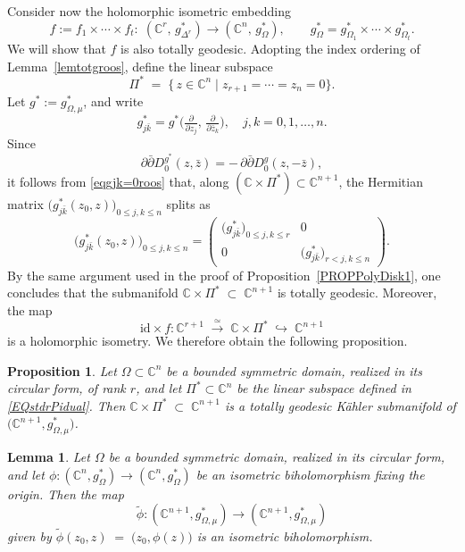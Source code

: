 \documentclass[reqno, 11pt]{amsart}
\newtheorem{prop}[theor]{Proposition}
\newtheorem{lemma}[theor]{Lemma}
\newcommand{\C}{\mathbb{C}}
\begin{document}
Consider now the holomorphic isometric embedding
\[
f:=f_1\times\cdots\times f_t:\;(\C^{r},\,g_{\Delta^{r}}^*) \longrightarrow (\C^{n},\,g_{\Omega}^*),
\qquad
g_{\Omega}^*=g_{\Omega_1}^*\times\cdots\times g_{\Omega_t}^*.
\]
We will show that $f$ is also totally geodesic. Adopting the index ordering of Lemma~\ref{lemtotgroos}, define the linear subspace
\begin{equation}\label{EQstdrPidual}
\Pi^* \;=\; \{\,z\in\C^n \mid z_{r+1}=\cdots=z_n=0\}.
\end{equation}
Let $g^*:=g^*_{{\Omega,\mu}}$, and write
\[
g^*_{j\bar k}
= g^*\!\bigl(\tfrac{\partial}{\partial z_j},\,\tfrac{\partial}{\partial\bar z_k}\bigr),
\quad
j,k = 0,1,\dots,n.
\]
Since
\[
\partial\bar\partial D^{g^*}_0(z,\bar z)
= -\,\partial\bar\partial D^g_0(z,-\bar z),
\]
it follows from \eqref{eqgjk=0roos} that, along $(\C\times\Pi^*)\subset\C^{n+1}$, the Hermitian matrix $\bigl(g^*_{j\bar k}(z_0,z)\bigr)_{0\le j,k\le n}$ splits as
\begin{equation}\label{eqgjk=0dual}
\bigl(g^*_{j\bar k}(z_0,z)\bigr)_{0\le j,k\le n}
=
\begin{pmatrix}
\bigl(g^*_{j\bar k}\bigr)_{0\le j,k\le r} & 0\\[6pt]
0 & \bigl(g^*_{j\bar k}\bigr)_{r<j,k\le n}
\end{pmatrix}.
\end{equation}
By the same argument used in the proof of Proposition~\ref{PROPPolyDisk1}, one concludes that the submanifold
$\C \times \Pi^* \;\subset\; \C^{n+1}$
is totally geodesic. Moreover, the map
\[
\mathrm{id}\times f \colon \C^{r+1}\;\xrightarrow{\simeq}\;\C\times\Pi^*\;\hookrightarrow\;\C^{n+1}
\]
is a holomorphic isometry. We therefore obtain the following proposition.

\begin{prop}\label{PROPPolyDual}
Let $\Omega\subset\C^n$ be a bounded symmetric domain, realized in its circular form, of rank $r$, and let $\Pi^*\subset\C^n$ be the linear subspace defined in \eqref{EQstdrPidual}. Then 
$\C \times \Pi^* \;\subset\; \C^{n+1}$
is a totally geodesic Kähler submanifold of $\bigl(\C^{n+1},g^*_{{\Omega,\mu}}\bigr)$.
\end{prop}





\begin{lemma}\label{LEMliftgend}
Let \(\Omega\) be a bounded symmetric domain, realized in its circular form, and let 
\(\phi\colon (\C^n,g_{\Omega}^*)\to(\C^n,g_{\Omega}^*)\)
be an isometric biholomorphism fixing the origin.  Then the  map 
\[
\tilde\phi\colon (\C^{n+1},g^*_{{\Omega,\mu}})\longrightarrow(\C^{n+1},g^*_{{\Omega,\mu}})
\]
given by $\tilde\phi(z_0, z) \;=\; \bigl(z_0, \phi(z)\bigr)$ is an isometric biholomorphism.
\end{lemma}
\end{document}

